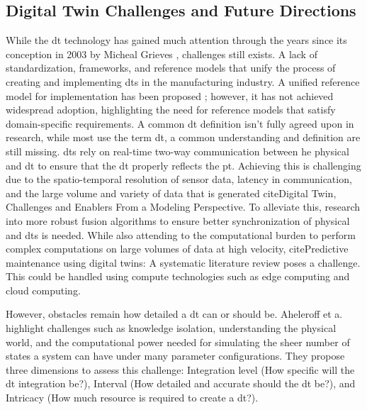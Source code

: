 \subsection{Digital Twin Challenges and Future Directions}
While the \ac{dt} technology has gained much attention through the years since its conception in 2003 by Micheal Grieves \cite{TAO2019653}, challenges still exists.
A lack of standardization, frameworks, and reference models that unify the process of creating and implementing \ac{dt}s in the manufacturing industry.
A unified reference model for implementation has been proposed \cite{AHELEROFF2021101225}; however, it has not achieved widespread adoption, highlighting the need for reference models that satisfy domain-specific requirements.
A common \ac{dt} definition isn't fully agreed upon in research, while most use the term \ac{dt}, a common understanding and definition are still missing.
\ac{dt}s rely on real-time two-way communication between he physical and \ac{dt} to ensure that the \ac{dt} properly reflects the \ac{pt}.
Achieving this is challenging due to the spatio-temporal resolution of sensor data, latency in communication, and the large volume and variety of data that is generated cite{Digital Twin, Challenges and Enablers From a Modeling Perspective}.
To alleviate this, research into more robust fusion algorithms to ensure better synchronization of physical and \ac{dt}s is needed.
While also attending to the computational burden to perform complex computations on large volumes of data at high velocity, cite{Predictive maintenance using digital twins: A systematic literature review} poses a challenge.
This could be handled using compute technologies such as edge computing and cloud computing.

However, obstacles remain how detailed a \ac{dt} can or should be.
Aheleroff et a. \cite{AHELEROFF2021101225} highlight challenges such as knowledge isolation, understanding the physical world, and the computational power needed for simulating the sheer number of states a system can have under many parameter configurations.
They propose three dimensions to assess this challenge: Integration level (How specific will the \ac{dt} integration be?), Interval (How detailed and accurate should the \ac{dt} be?), and Intricacy (How much resource is required to create a \ac{dt}?).  %

